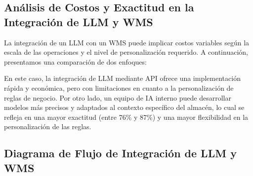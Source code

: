 \subsection{Análisis de Costos y Exactitud en la Integración de LLM y WMS}

La integración de un LLM con un WMS puede implicar costos variables según la escala de las operaciones y el nivel de personalización requerido. A continuación, presentamos una comparación de dos enfoques:

\begin{table}[H]
\centering
\caption{Comparación de Costos y Resultados: LLM mediante API en un WMS vs. Equipo Interno de Ciencia de Datos}
\end{table}

En este caso, la integración de LLM mediante API ofrece una implementación rápida y económica, pero con limitaciones en cuanto a la personalización de reglas de negocio. Por otro lado, un equipo de IA interno puede desarrollar modelos más precisos y adaptados al contexto específico del almacén, lo cual se refleja en una mayor exactitud (entre 76\% y 87\%) y una mayor flexibilidad en la personalización de las reglas.

\subsection{Diagrama de Flujo de Integración de LLM y WMS}

